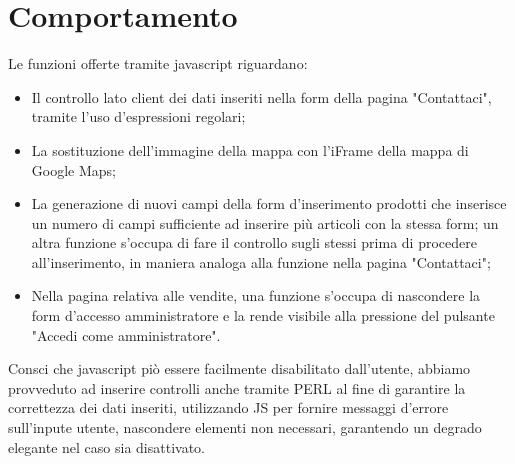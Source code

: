 \section{Comportamento}{
	Le funzioni offerte tramite javascript riguardano: 
	\begin{itemize}
		\item Il controllo lato client dei dati inseriti nella form della pagina "Contattaci", tramite l'uso d'espressioni regolari;
		\item La sostituzione dell'immagine della mappa con l'iFrame della mappa di Google Maps;
		\item La generazione di nuovi campi della form d'inserimento prodotti che inserisce un numero di campi sufficiente ad inserire più articoli con la stessa form; un altra funzione s'occupa di fare il controllo sugli stessi prima di procedere all'inserimento, in maniera analoga alla funzione nella pagina "Contattaci";
		\item Nella pagina relativa alle vendite, una funzione s'occupa di nascondere la form d'accesso amministratore e la rende visibile alla pressione del pulsante "Accedi come amministratore".
	\end{itemize}
	Consci che javascript piò essere facilmente disabilitato dall'utente, abbiamo provveduto ad inserire controlli anche tramite PERL al fine di garantire la correttezza dei dati inseriti, utilizzando JS per fornire messaggi d'errore sull'inpute utente, nascondere elementi non necessari, garantendo un degrado elegante nel caso sia disattivato.
}